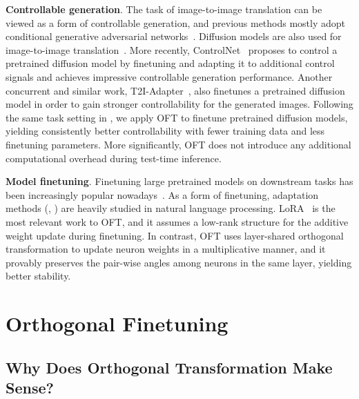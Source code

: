 \textbf{Controllable generation}. The task of image-to-image translation can be viewed as a form of controllable generation, and previous methods mostly adopt conditional generative adversarial networks~\cite{isola2017image,zhu2017toward,wang2018high,park2019semantic,choi2018stargan}. Diffusion models are also used for image-to-image translation~\cite{saharia2022palette,voynov2022sketch,wang2022pretraining}. More recently, ControlNet~\cite{zhang2023adding} proposes to control a pretrained diffusion model by finetuning and adapting it to additional control signals and achieves impressive controllable generation performance. Another concurrent and similar work, T2I-Adapter~\cite{mou2023t2i}, also finetunes a pretrained diffusion model in order to gain stronger controllability for the generated images. Following the same task setting in \cite{zhang2023adding,mou2023t2i}, we apply OFT to finetune pretrained diffusion models, yielding consistently better controllability with fewer training data and less finetuning parameters. More significantly, OFT does not introduce any additional computational overhead during test-time inference.



\textbf{Model finetuning}. Finetuning large pretrained models on downstream tasks has been increasingly 
popular nowadays~\cite{devlin2018bert,brown2020language,he2022masked}. As a form of finetuning, adaptation methods (\eg, \cite{hulora2022,houlsby2019parameter,pfeiffer2020adapterfusion}) are heavily studied in natural language processing. LoRA~\cite{hulora2022} is the most relevant work to OFT, and it assumes a low-rank structure for the additive weight update during finetuning. In contrast, OFT uses layer-shared orthogonal transformation to update neuron weights in a multiplicative manner, and it provably preserves the pair-wise angles among neurons in the same layer, yielding better stability.

\vspace{-1.6mm}
\section{Orthogonal Finetuning}
\vspace{-1.15mm}

\subsection{Why Does Orthogonal Transformation Make Sense?}
\vspace{-.9mm}

